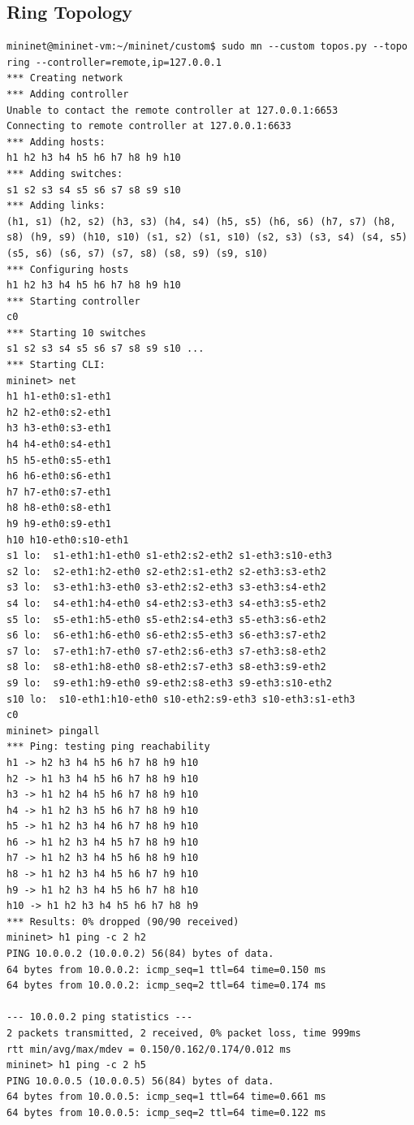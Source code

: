 \documentclass[a4paper, 11pt]{article}
\begin{document}
\begin{appendices}
\subsection{Ring Topology}
\label{appendix:ring}
\begin{lstlisting}[style=BashInputStyle]
mininet@mininet-vm:~/mininet/custom$ sudo mn --custom topos.py --topo ring --controller=remote,ip=127.0.0.1
*** Creating network
*** Adding controller
Unable to contact the remote controller at 127.0.0.1:6653
Connecting to remote controller at 127.0.0.1:6633
*** Adding hosts:
h1 h2 h3 h4 h5 h6 h7 h8 h9 h10
*** Adding switches:
s1 s2 s3 s4 s5 s6 s7 s8 s9 s10
*** Adding links:
(h1, s1) (h2, s2) (h3, s3) (h4, s4) (h5, s5) (h6, s6) (h7, s7) (h8, s8) (h9, s9) (h10, s10) (s1, s2) (s1, s10) (s2, s3) (s3, s4) (s4, s5) (s5, s6) (s6, s7) (s7, s8) (s8, s9) (s9, s10)
*** Configuring hosts
h1 h2 h3 h4 h5 h6 h7 h8 h9 h10
*** Starting controller
c0
*** Starting 10 switches
s1 s2 s3 s4 s5 s6 s7 s8 s9 s10 ...
*** Starting CLI:
mininet> net
h1 h1-eth0:s1-eth1
h2 h2-eth0:s2-eth1
h3 h3-eth0:s3-eth1
h4 h4-eth0:s4-eth1
h5 h5-eth0:s5-eth1
h6 h6-eth0:s6-eth1
h7 h7-eth0:s7-eth1
h8 h8-eth0:s8-eth1
h9 h9-eth0:s9-eth1
h10 h10-eth0:s10-eth1
s1 lo:  s1-eth1:h1-eth0 s1-eth2:s2-eth2 s1-eth3:s10-eth3
s2 lo:  s2-eth1:h2-eth0 s2-eth2:s1-eth2 s2-eth3:s3-eth2
s3 lo:  s3-eth1:h3-eth0 s3-eth2:s2-eth3 s3-eth3:s4-eth2
s4 lo:  s4-eth1:h4-eth0 s4-eth2:s3-eth3 s4-eth3:s5-eth2
s5 lo:  s5-eth1:h5-eth0 s5-eth2:s4-eth3 s5-eth3:s6-eth2
s6 lo:  s6-eth1:h6-eth0 s6-eth2:s5-eth3 s6-eth3:s7-eth2
s7 lo:  s7-eth1:h7-eth0 s7-eth2:s6-eth3 s7-eth3:s8-eth2
s8 lo:  s8-eth1:h8-eth0 s8-eth2:s7-eth3 s8-eth3:s9-eth2
s9 lo:  s9-eth1:h9-eth0 s9-eth2:s8-eth3 s9-eth3:s10-eth2
s10 lo:  s10-eth1:h10-eth0 s10-eth2:s9-eth3 s10-eth3:s1-eth3
c0
mininet> pingall
*** Ping: testing ping reachability
h1 -> h2 h3 h4 h5 h6 h7 h8 h9 h10
h2 -> h1 h3 h4 h5 h6 h7 h8 h9 h10
h3 -> h1 h2 h4 h5 h6 h7 h8 h9 h10
h4 -> h1 h2 h3 h5 h6 h7 h8 h9 h10
h5 -> h1 h2 h3 h4 h6 h7 h8 h9 h10
h6 -> h1 h2 h3 h4 h5 h7 h8 h9 h10
h7 -> h1 h2 h3 h4 h5 h6 h8 h9 h10
h8 -> h1 h2 h3 h4 h5 h6 h7 h9 h10
h9 -> h1 h2 h3 h4 h5 h6 h7 h8 h10
h10 -> h1 h2 h3 h4 h5 h6 h7 h8 h9
*** Results: 0% dropped (90/90 received)
mininet> h1 ping -c 2 h2
PING 10.0.0.2 (10.0.0.2) 56(84) bytes of data.
64 bytes from 10.0.0.2: icmp_seq=1 ttl=64 time=0.150 ms
64 bytes from 10.0.0.2: icmp_seq=2 ttl=64 time=0.174 ms

--- 10.0.0.2 ping statistics ---
2 packets transmitted, 2 received, 0% packet loss, time 999ms
rtt min/avg/max/mdev = 0.150/0.162/0.174/0.012 ms
mininet> h1 ping -c 2 h5
PING 10.0.0.5 (10.0.0.5) 56(84) bytes of data.
64 bytes from 10.0.0.5: icmp_seq=1 ttl=64 time=0.661 ms
64 bytes from 10.0.0.5: icmp_seq=2 ttl=64 time=0.122 ms


\end{lstlisting}
\end{appendices}
\end{document}
